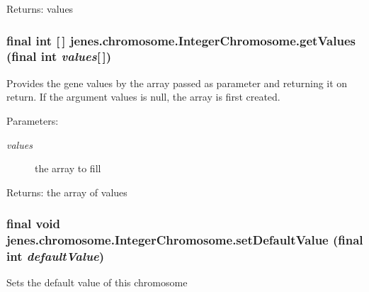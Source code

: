 \begin{Desc}
\item[Returns:]values \end{Desc}
\hypertarget{classjenes_1_1chromosome_1_1_integer_chromosome_dc4af1dfafa5c20d92ee91a79d289317}{
\subsubsection[getValues]{\setlength{\rightskip}{0pt plus 5cm}final int \mbox{[}$\,$\mbox{]} jenes.chromosome.IntegerChromosome.getValues (final int {\em values}\mbox{[}$\,$\mbox{]})}}
\label{classjenes_1_1chromosome_1_1_integer_chromosome_dc4af1dfafa5c20d92ee91a79d289317}


Provides the gene values by the array passed as parameter and returning it on return. If the argument values is null, the array is first created. 

\begin{Desc}
\item[Parameters:]
\begin{description}
\item[{\em values}]the array to fill \end{description}
\end{Desc}
\begin{Desc}
\item[Returns:]the array of values \end{Desc}
\hypertarget{classjenes_1_1chromosome_1_1_integer_chromosome_682f03e84e51f0e132a657b25236d432}{
\subsubsection[setDefaultValue]{\setlength{\rightskip}{0pt plus 5cm}final void jenes.chromosome.IntegerChromosome.setDefaultValue (final int {\em defaultValue})}}
\label{classjenes_1_1chromosome_1_1_integer_chromosome_682f03e84e51f0e132a657b25236d432}


Sets the default value of this chromosome 

